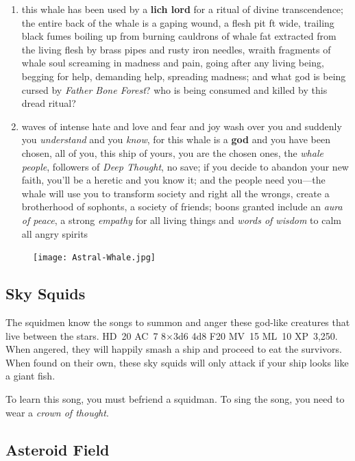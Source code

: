 \documentclass[11pt]{bxart}
\begin{document}
\begin{enumerate}
\item this whale has been used by a \textbf{lich lord} for a ritual of
  divine transcendence; the entire back of the whale is a gaping
  wound, a flesh pit \unit[500]{ft} wide, trailing black fumes boiling
  up from burning cauldrons of whale fat extracted from the living
  flesh by brass pipes and rusty iron needles, wraith fragments of
  whale soul screaming in madness and pain, going after any living
  being, begging for help, demanding help, spreading madness; and what
  god is being cursed by \textit{Father Bone Forest}? who is being
  consumed and killed by this dread ritual?

\item waves of intense hate and love and fear and joy wash over you
  and suddenly you \textit{understand} and you \textit{know}, for this
  whale is a \textbf{god} and you have been chosen, all of you, this
  ship of yours, you are the chosen ones, the \textit{whale people},
  followers of \textit{Deep Thought}, no save; if you decide to
  abandon your new faith, you'll be a heretic and you know it; and the
  people need you—the whale will use you to transform society and
  right all the wrongs, create a brotherhood of sophonts, a society of
  friends; boons granted include an \textit{aura of peace}, a strong
  \textit{empathy} for all living things and \textit{words of wisdom}
  to calm all angry spirits
\end{enumerate}

\begin{figure}[h]
  \centering
  \texttt{[image: Astral-Whale.jpg]}
\end{figure}

\subsection{Sky Squids}

The squidmen know the songs to summon and anger these god-like
creatures that live between the stars. HD~20 AC~7 8×3d6 4d8 F20 MV~15
ML~10 XP~3,250. When angered, they will happily smash a ship and
proceed to eat the survivors. When found on their own, these sky
squids will only attack if your ship looks like a giant fish.

To learn this song, you must befriend a squidman. To sing the song,
you need to wear a \textit{crown of thought}.

\subsection{Asteroid Field}
\end{document}

